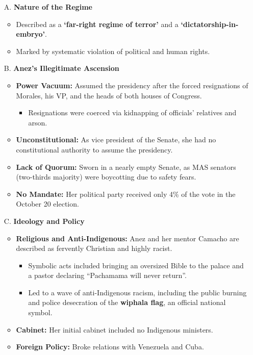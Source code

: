 \documentclass{article}
\begin{document}
    \begin{itemize}
        \item [A.] \textbf{Nature of the Regime}
        \begin{itemize}
            \item Described as a \textbf{`far-right regime of terror'} and a \textbf{`dictatorship-in-embryo'}.
            \item Marked by systematic violation of political and human rights.
        \end{itemize}
        \item[B.] \textbf{Anez's Illegitimate Ascension}
        \begin{itemize}
            \item \textbf{Power Vacuum:} Assumed the presidency after the
            forced resignations of Morales, his VP, and the heads of both
            houses of Congress.
        \begin{itemize}
            \item Resignations were coerced via kidnapping of officials'
            relatives and arson.
        \end{itemize}
            \item \textbf{Unconstitutional:} As vice president of the
            Senate, she had no constitutional authority to assume the
            presidency.
        \item \textbf{Lack of Quorum:} Sworn in a nearly empty Senate, as
            MAS senators (two-thirds majority) were boycotting due to safety
            fears.
            \item \textbf{No Mandate:} Her political party received only 4\%
            of the vote in the October 20 election.
        \end{itemize}
        \item[C.] \textbf{Ideology and Policy}
        \begin{itemize}
            \item \textbf{Religious and Anti-Indigenous:} Anez and her
            mentor Camacho are described as fervently Christian and highly
            racist.
            \begin{itemize}
                \item Symbolic acts included bringing an oversized Bible to
                the palace and a pastor declaring ``Pachamama will never
                return''.
                \item Led to a wave of anti-Indigenous racism, including the
                public burning and police desecration of the
                \textbf{wiphala flag}, an official national symbol.
            \end{itemize}
            \item \textbf{Cabinet:} Her initial cabinet included no
            Indigenous ministers.
            \item \textbf{Foreign Policy:} Broke relations with Venezuela
            and Cuba.
        \end{itemize}
    \end{itemize}
\end{document}
